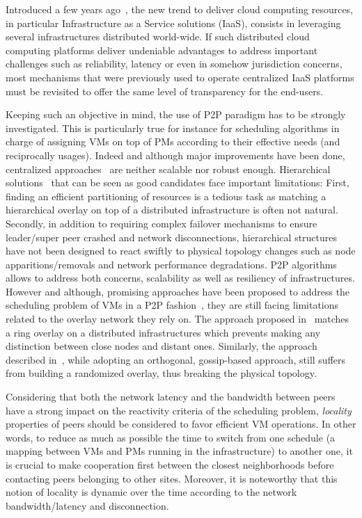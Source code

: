 Introduced a few years ago~\cite{greenberg:sigcomm09}, the new trend to deliver cloud
computing resources, in particular Infrastructure as a Service solutions (IaaS), consists
in leveraging several infrastructures distributed world-wide. If such distributed cloud
computing platforms deliver undeniable advantages to address important challenges such as
reliability, latency or even in somehow jurisdiction concerns, most mechanisms that were
previously used to operate centralized IaaS platforms must be revisited to offer the same
level of transparency for the end-users.

Keeping such an objective in mind, the use of P2P paradigm has to be strongly
investigated. This is particularly true for instance for scheduling algorithms in charge
of assigning VMs on top of PMs according to their effective needs (and reciprocally
usages). Indeed and although major improvements have been done, centralized
approaches~\cite{hermenier:2013} are neither scalable nor robust enough. Hierarchical
solutions~\cite{feller:ccgrid12} that can be seen as good candidates face important
limitations: First, finding an efficient partitioning of resources is a tedious task as
matching a hierarchical overlay on top of a distributed infrastructure is often not
natural. Secondly, in addition to requiring complex failover mechanisms to ensure
leader/super peer crashed and network disconnections, hierarchical structures have not
been designed to react swiftly to physical topology changes such as node
apparitions/removals and network performance degradations. P2P algorithms allows to
address both concerns, \ie scalability as well as resiliency of infrastructures. However
and although, promising approaches have been proposed to address the scheduling problem of
VMs in a P2P fashion~\cite{quesnel:cpe2012,feller:cloudcom12}, they are still facing
limitations related to the overlay network they rely on. The approach proposed
in~\cite{quesnel:cpe2012} matches a ring overlay on a distributed infrastructures which
prevents making any distinction between close nodes and distant ones. Similarly, the
approach described in~\cite{feller:cloudcom12}, while adopting an orthogonal, gossip-based approach,
still suffers from building a randomized overlay, thus breaking the physical topology.

Considering that both the network latency and the bandwidth between peers have a strong
impact on the reactivity criteria of the scheduling problem, \emph{locality} properties of
peers should be considered to favor efficient VM operations. In other words, to reduce as
much as possible the time to switch from one schedule (\ie a mapping between VMs and PMs
running in the infrastructure) to another one, it is crucial to make cooperation first
between the closest neighborhoods before contacting peers belonging to other sites.
Moreover, it is noteworthy that this notion of locality is dynamic over the time according
to the network bandwidth/latency and disconnection.

